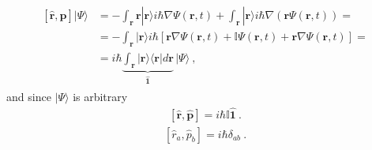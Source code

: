 \documentclass[letterpaper,10pt,english]{jupyterBook}
\begin{document}
\begin{equation*}
\begin{split}
\begin{aligned}
\left[ \hat{\mathbf{r}}, \hat{\mathbf{p}} \right] | \Psi \rangle 
 & = - \int_{\mathbf{r}} \mathbf{r} | \mathbf{r} \rangle i \hbar \nabla \Psi(\mathbf{r},t) + \int_{\mathbf{r}} | \mathbf{r} \rangle i \hbar \nabla \left( \mathbf{r} \Psi(\mathbf{r},t) \right) = \\
 & = - \int_{\mathbf{r}} | \mathbf{r} \rangle i \hbar \left[ \mathbf{r} \nabla \Psi(\mathbf{r},t) + \mathbb{I} \Psi(\mathbf{r},t) + \mathbf{r} \nabla \Psi(\mathbf{r},t) \right] = \\
 & = i \hbar \underbrace{\int_{\mathbf{r}} | \mathbf{r} \rangle \langle \mathbf{r} | d \mathbf{r}}_{\hat{\mathbf{1}}} \, | \Psi \rangle \ ,
\end{aligned}\end{split}
\end{equation*}
\sphinxAtStartPar
and since \(| \Psi \rangle\) is arbitrary
\begin{equation*}
\begin{split}\left[ \hat{\mathbf{r}}, \hat{\mathbf{p}} \right] = i \hbar \mathbb{I} \hat{\mathbf{1}} \ . \end{split}
\end{equation*}\begin{equation*}
\begin{split}\left[ \hat{r}_a, \hat{p}_b \right] = i \hbar \delta_{ab} \ . \end{split}
\end{equation*}
\end{document}
